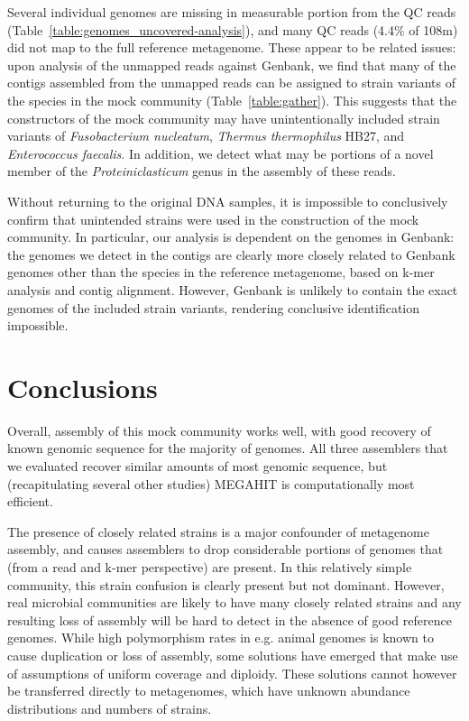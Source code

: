 \documentclass[11pt]{article}
\begin{document}
Several individual genomes are missing in measurable portion from the
QC reads (Table~\ref{table:genomes_uncovered-analysis}), and many QC
reads (4.4\% of 108m) did not map to the full reference metagenome.
These appear to be related issues: upon analysis of the unmapped reads
against Genbank, we find that many of the contigs assembled from the
unmapped reads can be assigned to strain variants of the species in
the mock community (Table~\ref{table:gather}).  This suggests that the
constructors of the mock community may have unintentionally included
strain variants of {\em Fusobacterium nucleatum}, {\em Thermus
  thermophilus} HB27, and {\em Enterococcus faecalis}.  In addition,
we detect what may be portions of a novel member of the {\em
  Proteiniclasticum} genus in the assembly of these reads.

Without returning to the original DNA samples, it is impossible to
conclusively confirm that unintended strains were used in the
construction of the mock community.  In particular, our analysis is
dependent on the genomes in Genbank: the genomes we detect in the
contigs are clearly more closely related to Genbank genomes other than
the species in the reference metagenome, based on k-mer analysis and
contig alignment.  However, Genbank is unlikely to contain the exact
genomes of the included strain variants, rendering conclusive
identification impossible.

\section*{Conclusions}


Overall, assembly of this mock community works well, with good
recovery of known genomic sequence for the majority of genomes.  All
three assemblers that we evaluated recover similar amounts of most
genomic sequence, but (recapitulating several other studies) MEGAHIT
is computationally most efficient.

The presence of closely related strains is a major confounder of
metagenome assembly, and causes assemblers to drop considerable
portions of genomes that (from a read and k-mer perspective) are
present.  In this relatively simple community, this strain confusion
is clearly present but not dominant.  However, real microbial
communities are likely to have many closely related strains and any
resulting loss of assembly will be hard to detect in the absence of
good reference genomes.  While high polymorphism rates in e.g. animal
genomes is known to cause duplication or loss of assembly, some
solutions have emerged that make use of assumptions of uniform
coverage and diploidy.  These solutions cannot however be transferred
directly to metagenomes, which have unknown abundance distributions
and numbers of strains.
\end{document}

